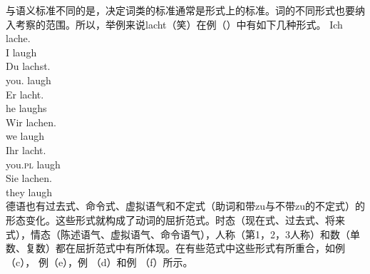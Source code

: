 与语义标准不同的是，决定词类的标准通常是形式上的标准。词的不同形式也要纳入考察的范围。所以，举例来说lacht（笑）在例（）中有如下几种形式。
\eal
\ex 
\gll Ich lache.\\
     I laugh\\
\ex 
\gll Du lachst.\\
     you.\sg{} laugh\\
\ex 
\gll Er lacht.\\
     he laughs\\
\ex 
\gll Wir lachen.\\
     we laugh\\
\ex 
\gll Ihr lacht.\\
     you.\textsc{pl} laugh\\
\ex 
\gll Sie lachen.\\
     they laugh\\
\zl
德语也有过去式、命令式、虚拟语气和不定式（助词和带zu与不带zu的不定式）的形态变化。这些形式就构成了动词的屈折范式。时态（现在式、过去式、将来式），情态（陈述语气、虚拟语气、命令语气），人称（第1，2，3人称）和数（单数、复数）都在屈折范式中有所体现。在有些范式中这些形式有所重合，如例（c）， 例（e），例 （d）和例 （f）所示。

